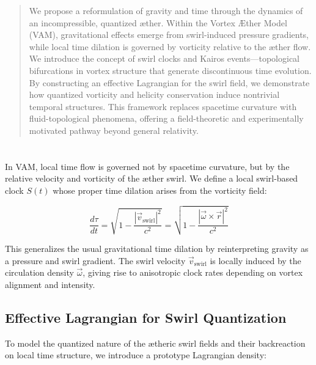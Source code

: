 \documentclass[12pt]{article}
\begin{document}
    \titlepageOpen

    \begin{abstract}

We propose a reformulation of gravity and time through the dynamics of an incompressible, quantized æther. Within the Vortex Æther Model (VAM), gravitational effects emerge from swirl-induced pressure gradients, while local time dilation is governed by vorticity relative to the æther flow. We introduce the concept of swirl clocks and Kairos events—topological bifurcations in vortex structure that generate discontinuous time evolution. By constructing an effective Lagrangian for the swirl field, we demonstrate how quantized vorticity and helicity conservation induce nontrivial temporal structures. This framework replaces spacetime curvature with fluid-topological phenomena, offering a field-theoretic and experimentally motivated pathway beyond general relativity.

    \end{abstract}



    \titlepageClose
    \fi

    \section{\papertitle}


In VAM, local time flow is governed not by spacetime curvature, but by the relative velocity and vorticity of the æther swirl. We define a local swirl-based clock \( S(t) \) whose proper time dilation arises from the vorticity field:

\[
    \frac{d\tau}{dt} = \sqrt{1 - \frac{|\vec{v}_{\text{swirl}}|^2}{c^2}} = \sqrt{1 - \frac{|\vec{\omega} \times \vec{r}|^2}{c^2}}
\]

This generalizes the usual gravitational time dilation by reinterpreting gravity as a pressure and swirl gradient. The swirl velocity \( \vec{v}_{\text{swirl}} \) is locally induced by the circulation density \( \vec{\omega} \), giving rise to anisotropic clock rates depending on vortex alignment and intensity.

\subsection{Effective Lagrangian for Swirl Quantization}

To model the quantized nature of the ætheric swirl fields and their backreaction on local time structure, we introduce a prototype Lagrangian density:
\end{document}
